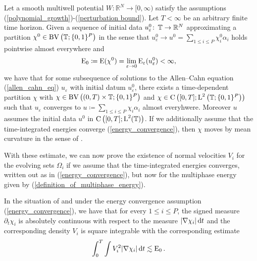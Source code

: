 \begin{theorem}
	\label{convergence_to_multiphase_mcf}
	Let a smooth multiwell potential $ W \colon \mathbb{ R }^{ N } \to [ 0, 
	\infty ) $ satisfy the assumptions 
	(\ref{polynomial_growth})-(\ref{perturbation bound}). Let $ T < \infty 
	$ be an arbitrary finite time horizon. Given a sequence of initial data 
	$ u_{ \varepsilon }^{ 0 } \colon \operatorname{\mathbb{T}} \to \mathbb{ R }^{ N } $ 
	approximating a partition 
	$ \chi^{ 0 } \in \operatorname{BV} \left( \operatorname{\mathbb{T}} ; \{ 0 , 1 \}^{ P } \right) $ 
	in the sense that 
	$ u_{ \varepsilon }^{ 0 } \to u^{ 0 } =  \sum_{ 1 \leq i \leq P } 
	\chi_{ i }^{ 0 } \alpha_{ i } $ 
	holds pointwise almost everywhere and 
	\begin{equation*} 
		\operatorname{E}_{ 0 } 
		\coloneqq 
		\operatorname{E} ( \chi^{ 0 } ) 
		= 
		\lim_{ \varepsilon \to 0 } 
		\operatorname{E}_{ \varepsilon } ( u_{ \varepsilon }^{ 0 } ) 
		< 
		\infty,
	\end{equation*}
	we have that for 
	some subsequence of solutions to the Allen--Cahn equation
	(\ref{allen_cahn_eq}) $ u_{\varepsilon } $ with initial datum $ u_{ 
		\varepsilon }^{ 0 } $, there exists a time-dependent partition $ \chi $ 
	with 
	$ \chi \in \operatorname{BV} \left( ( 0 , T ) \times \operatorname{\mathbb{T}} ; \{ 0 , 1 \}^{ P } 
	\right) $ and
	$ \chi 
	\in \operatorname{C} \left( [ 0 , T ] ; \operatorname{L}^{ 2 } \left( \operatorname{\mathbb{T}} ;  \{ 0 , 1 
	\}^{ P } \right) \right) $ such that $ u_{ \varepsilon } $ converges to 
	$ u \coloneqq \sum_{ 1 \leq i \leq P } \chi_{ i } \alpha_{ i } $ almost 
	everyhwere. Moreover $ u $ assumes the initial data $ u^{ 0 } $ in $ 
	\operatorname{C} \left( [ 0, T ] ; \operatorname{L}^{ 2 }( \operatorname{\mathbb{T}} ) \right) $. If we 
	additionally assume that the 
	time-integrated energies converge (\ref{energy_convergence}), then $ 
	\chi $ moves by mean curvature in the sense of .
\end{theorem} 

With these estimate, we can now prove the existence of normal velocities $ V_{ 
i } $ for the evolving sets $ \Omega_{ i } $ if we assume that the 
time-integrated energies converges, written out as in 
(\ref{energy_convergence}), but now for the multiphase energy given by 
(\ref{definition_of_multiphase_energy}).

\begin{proposition}
	\label{existence_and_square_integrability_of_velocities_multiphase}
	In the situation of  and under 
	the energy convergence assumption (\ref{energy_convergence}), we have that 
	for every $ 1 \leq i \leq P $, the signed measure $ \partial_{ t } \chi_{ i 
	} $ is absolutely continuous with respect to the measure $ \abs{ \nabla 
	\chi_{i } } \dd{ t } $ and the corresponding density $ V_{ i } $ is square 
	integrable with the corresponding estimate
	\begin{equation}
		\label{velocity_l2_estimate}
		\int_{ 0 }^{ T }
		\int
		V_{ i }^{ 2 }
		\abs{ \nabla \chi_{ i } }
		\dd{ t }
		\lesssim
		\operatorname{E}_{ 0 }.
	\end{equation}
\end{proposition}

